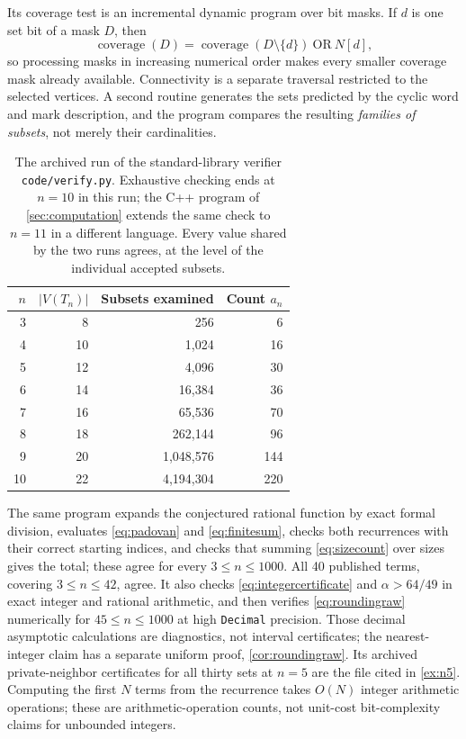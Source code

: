 \documentclass[11pt,letterpaper]{article}
\numberwithin{equation}{section}
\theoremstyle{definition}
\newcommand{\1}{\mathbf 1}
\begin{document}
Its coverage test is an incremental dynamic program over bit masks. If $d$ is
one set bit of a mask $D$, then
\begin{equation}\label{eq:coveragedp}
 \operatorname{coverage}(D)
 =\operatorname{coverage}(D\setminus\{d\})\ \mathrm{OR}\ N[d],
\end{equation}
so processing masks in increasing numerical order makes every smaller coverage
mask already available. Connectivity is a separate traversal restricted to the
selected vertices. A second routine generates the sets predicted by the cyclic
word and mark description, and the program compares the resulting
\emph{families of subsets}, not merely their cardinalities.
\begin{table}[ht]
\centering
\begin{tabular}{rrrr}
\toprule
$n$ & $|V(T_n)|$ & Subsets examined & Count $a_n$\\
\midrule
3&8&256&6\\
4&10&1,024&16\\
5&12&4,096&30\\
6&14&16,384&36\\
7&16&65,536&70\\
8&18&262,144&96\\
9&20&1,048,576&144\\
10&22&4,194,304&220\\
\bottomrule
\end{tabular}
\caption{The archived run of the standard-library verifier
\texttt{code/verify.py}. Exhaustive checking ends at $n=10$ in this run; the
C++ program of \cref{sec:computation} extends the same check to $n=11$ in a
different language. Every value shared by the two runs agrees, at the level of
the individual accepted subsets.}
\label{tab:secondverifier}
\end{table}
The same program expands the conjectured rational function by exact formal
division, evaluates \eqref{eq:padovan} and \eqref{eq:finitesum}, checks both
recurrences with their correct starting indices, and checks that summing
\eqref{eq:sizecount} over sizes gives the total; these agree for every
$3\le n\le1000$. All 40 published terms, covering $3\le n\le42$, agree. It also
checks \eqref{eq:integercertificate} and $\alpha>64/49$ in exact integer and
rational arithmetic, and then verifies \eqref{eq:roundingraw} numerically for
$45\le n\le1000$ at high \texttt{Decimal} precision. Those decimal asymptotic
calculations are diagnostics, not interval certificates; the nearest-integer
claim has a separate uniform proof, \cref{cor:roundingraw}. Its archived
private-neighbor certificates for all thirty sets at $n=5$ are the file cited
in \cref{ex:n5}. Computing the first $N$ terms from the recurrence takes $O(N)$
integer arithmetic operations; these are arithmetic-operation counts, not
unit-cost bit-complexity claims for unbounded integers.
\end{document}
